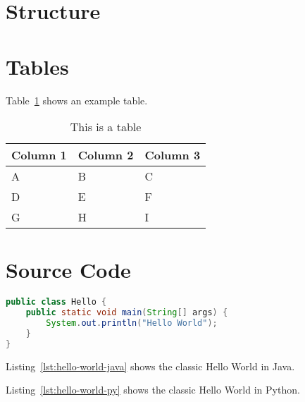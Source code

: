 \section{Structure}


\section{Tables}

Table~\ref{tab:table-one} shows an example table.

\begin{table}[htbp]
    \centering
    \caption{This is a table}
    \label{tab:table-one}
    \begin{tabular}{lll}
        \addlinespace
        \toprule
        Column 1 & Column 2 & Column 3 \\
        \midrule
        A     & B     & C \\
        D     & E     & F \\
        G     & H     & I \\
        \bottomrule
    \end{tabular}
\end{table}

\section{Source Code}

\begin{lstlisting}[language=Java, caption=Hello World in Java, label=lst:hello-world-java]
public class Hello {
    public static void main(String[] args) {
        System.out.println("Hello World");
    }
}
\end{lstlisting}

Listing~\ref{lst:hello-world-java} shows the classic Hello World in Java.



Listing~\ref{lst:hello-world-py} shows the classic Hello World in Python.
